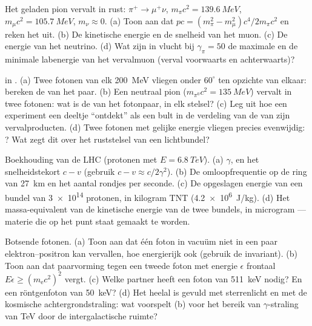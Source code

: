 \begin{exercise}[$\star\star$]\label{exo:b3:relativistic-dynamics:6}
Het geladen pion vervalt in rust: $\pi^+ \to \mu^+\nu$, $m_\pi c^2 =
\qty{139.6}{MeV}$, $m_\mu c^2 = \qty{105.7}{MeV}$, $m_\nu \approx 0$.
(a) Toon aan dat $pc = (m_\pi^2 - m_\mu^2)c^4/2m_\pi c^2$ en reken het
uit. (b) De kinetische energie en de snelheid van het muon. (c) De
energie van het neutrino. (d) Wat zijn in vlucht bij $\gamma_\pi = 50$ de
maximale en de minimale labenergie van het vervalmuon (verval voorwaarts
en achterwaarts)?
\end{exercise}

\begin{exercise}[$\star\star$]\label{exo:b3:relativistic-dynamics:7}
 in . (a) Twee fotonen van elk \qty{200}{MeV}
vliegen onder $60^\circ$ ten opzichte van elkaar: bereken de  van het paar. (b) Een neutraal pion ($m_{\pi^0}c^2 = \qty{135}{MeV}$) vervalt in twee fotonen: wat is de  van
het fotonpaar, in elk stelsel? (c) Leg uit hoe een experiment een deeltje
``ontdekt'' als een bult in de verdeling van de  van zijn
vervalproducten. (d) Twee fotonen met gelijke energie vliegen precies
evenwijdig: ? Wat zegt dit over het ruststelsel van een
lichtbundel?
\end{exercise}

\begin{exercise}[$\star\star$]\label{exo:b3:relativistic-dynamics:8}
Boekhouding van de LHC (protonen met $E = \qty{6.8}{TeV}$). (a) $\gamma$,
en het snelheidstekort $c - v$ (gebruik $c - v \approx c/2\gamma^2$). (b)
De omloopfrequentie op de ring van \qty{27}{km} en het aantal rondjes per
seconde. (c) De opgeslagen energie van een bundel van \num{3e14} protonen,
in kilogram TNT (\qty{4.2e6}{J/kg}). (d) Het massa-equivalent van de
kinetische energie van de twee bundels, in microgram --- materie die op
het punt staat gemaakt te worden.
\end{exercise}

\begin{exercise}[$\star\star$]\label{exo:b3:relativistic-dynamics:9}
Botsende fotonen. (a) Toon aan dat één foton in vacuüm niet in een paar
elektron--positron kan vervallen, hoe energierijk ook (gebruik de
invariant). (b) Toon aan dat paarvorming tegen een tweede foton met
energie $\epsilon$ frontaal $E\epsilon \ge (m_{\text{e}}c^2)^2$ vergt.
(c) Welke partner heeft een foton van \qty{511}{keV} nodig? En een
röntgenfoton van \qty{50}{keV}? (d) Het heelal is gevuld met sterrenlicht
en met de kosmische achtergrondstraling: wat voorspelt (b) voor het
bereik van $\gamma$-straling van TeV door de intergalactische ruimte?
\end{exercise}

